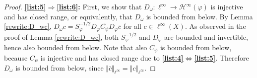 \documentclass{amsart}
\def\Hil{\mathcal{H}}
\newcommand{\B}[0]{{\mathcal{B}}}
\renewcommand{\H}{{\mathcal{H}}}
\begin{document}
\begin{proof}
\textbf{\ref{list:5}$\Rightarrow$\ref{list:6}:} First, we show that $D_{\omega}: \ell^{\infty}\to \Hil^{\infty}(\varphi)$ is injective and has closed range, or equivalently, that $D_\omega$ is bounded from below. %
By Lemma \ref{rewrite:D_wc}, $D_\omega c = S_{\varphi}^{-1/2} D_{\varphi} \overline{C_{\psi}} D_{\varphi} \overline{c}$ for all $c\in \ell^{\infty}(X)$. As observed in the proof of Lemma \ref{rewrite:D_wc}, both $S_{\varphi}^{-1/2}$ and  $D_{\varphi}$ are bounded and invertible, hence also bounded from below. Note that also $ \overline{C_{\psi}}$ is bounded from below, because $C_{\psi}$ is injective and has closed range due to \textbf{\ref{list:4}$\Leftrightarrow$\ref{list:5}}. Therefore $D_\omega$ is bounded from below, since $\Vert \overline{c} \Vert_{\ell^{\infty}} = \Vert c \Vert_{\ell^{\infty}}$. 


\end{proof}
\end{document}
